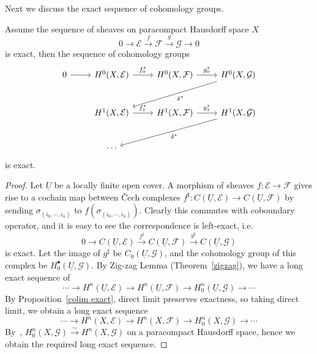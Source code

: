 Next we discuss the exact sequence of cohomology groups.

\begin{thm}\label{exact cohomology groups}
    Assume the sequence of sheaves on paracompact Hausdorff space $X$
    \[0\to\mathcal{E}\xrightarrow{f}\mathcal{F}\xrightarrow{g}\mathcal{G}\to 0\]
    is exact, then the sequence of cohomology groups
    \[\begin{tikzcd}
        0 \ar[r] & H^0(X,\mathcal{E}) \ar[r, "f_0^*"] & H^0(X,\mathcal{F}) \ar[r, "g_0^*"] & H^0(X,\mathcal{G}) \ar[dll, "\delta^*"] \\[3mm]
        {} & H^1(X,\mathcal{E}) \ar[r, "f_1^*"] & H^1(X,\mathcal{F}) \ar[r, "g_1^*"] & H^1(X,\mathcal{G}) \ar[dll, "\delta^*"] \\[3mm]
        {} & \cdots & {} & {}
    \end{tikzcd}\]
    is exact.
\end{thm}
\begin{proof}
    Let $\underline{U}$ be a locally finite open cover.
    A morphism of sheaves $f:\mathcal{E}\to\mathcal{F}$ gives rise to a cochain map between \v{C}ech complexes $f^\sharp:C(\underline{U},\mathcal{E})\to C(\underline{U},\mathcal{F})$ by sending $\sigma_{(i_0,\cdots,i_n)}$ to $f(\sigma_{(i_0,\cdots,i_n)})$.
    Clearly this commutes with coboundary operator, and it is easy to see the correspondence is left-exact, i.e.\
    \[0\to C(\underline{U},\mathcal{E})\xrightarrow{f^\sharp}C(\underline{U},\mathcal{F})\xrightarrow{g^\sharp}C(\underline{U},\mathcal{G})\]
    is exact.
    Let the image of $g^\sharp$ be $C_0(\underline{U},\mathcal{G})$, and the cohomology group of this complex be $H^\bullet_0(\underline{U},\mathcal{G})$.
    By Zig-zag Lemma (Theorem~\ref{zigzag}), we have a long exact sequence of
    \[\cdots\to H^n(\underline{U},\mathcal{E})\to H^n(\underline{U},\mathcal{F})\to H^n_0(\underline{U},\mathcal{G})\to\cdots\]
    By Proposition~\ref{colim exact}, direct limit preserves exactness, so taking direct limit, we obtain a long exact sequence
    \[\cdots\to H^n(X,\mathcal{E})\to H^n(X,\mathcal{F})\to H^n_0(X,\mathcal{G})\to\cdots\]
    By~\cite[25.\ Proposition 7]{FAC}, $H^n_0(X,\mathcal{G})\xrightarrow{\sim}H^n(X,\mathcal{G})$ on a paracompact Hausdorff space, hence we obtain the required long exact sequence.
\end{proof}


